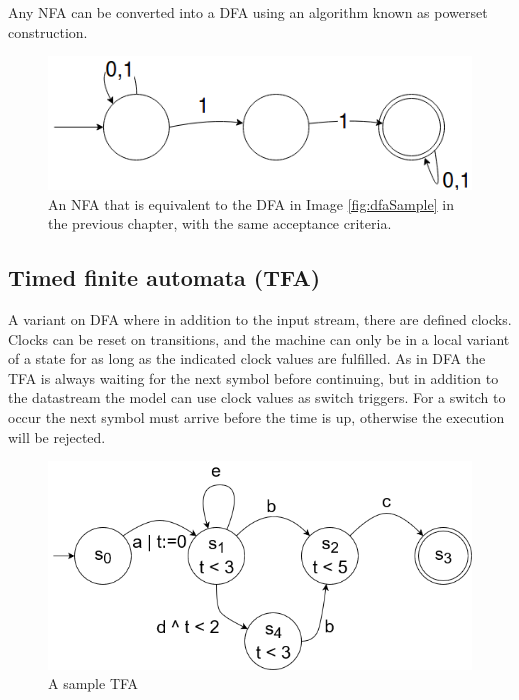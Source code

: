 Any NFA can be converted into a DFA using an algorithm known as powerset construction.

\begin{figure}[H]\label{}
    \centering
    \includegraphics[scale=0.5]{realTimeComputing/fig/NFA.png}
    \caption{An NFA that is equivalent to the DFA in Image \ref{fig:dfaSample} in the previous chapter, with the same acceptance criteria.}
    \label{fig:nfaSample}
\end{figure}

\subsection{Timed finite automata (TFA)}
A variant on DFA where in addition to the input stream, there are defined clocks. Clocks can be reset on transitions, and the machine can only be in a local variant of a state for as long as the indicated clock values are fulfilled. As in DFA the TFA is always waiting for the next symbol before continuing, but in addition to the datastream the model can use clock values as switch triggers. For a switch to occur the next symbol must arrive before the time is up, otherwise the execution will be rejected. 

\begin{figure}[H]\label{}
    \centering
    \includegraphics[scale=0.5]{realTimeComputing/fig/TFA.png}
    \caption{A sample TFA}
    \label{fig:tfaSample}
\end{figure}

